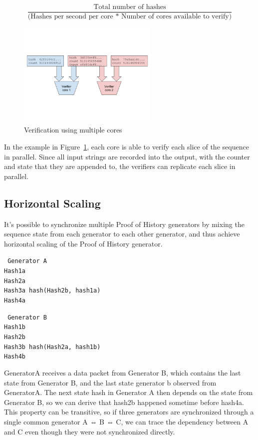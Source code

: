 \documentclass[12pt]{article}
\begin{document}
\[
\frac{\textrm{Total number of hashes}}{\textrm{(Hashes per second per core * Number of cores available to verify)}}
\]

\begin{figure}
  \begin{center}
    \centering
    \includegraphics[width=0.6\textwidth]{figures/fig_4.png}
    \caption[Figure 4]{Verification using multiple cores\label{fig:poh_verify}}
  \end{center}
  \end{figure}

In the example in Figure~\ref{fig:poh_verify}, each core is able to verify each slice of the sequence in parallel. Since all input strings are recorded into the output, with the counter and state that they are appended to, the verifiers can replicate each slice in parallel.

\subsection{Horizontal Scaling}
It’s possible to synchronize multiple Proof of History generators by mixing the sequence state from each generator to each other generator, and thus achieve horizontal scaling of the Proof of History generator.

\texttt{
Generator A\\
Hash1a\\
Hash2a\\
Hash3a hash(Hash2b, hash1a)\\
Hash4a\\
}

\texttt{
Generator B\\
Hash1b\\
Hash2b\\
Hash3b hash(Hash2a, hash1b)\\
Hash4b\\
}

GeneratorA receives a data packet from Generator B, which contains the last state from Generator B, and the last state generator b observed from GeneratorA. The next state hash in Generator A then depends on the state from Generator B, so we can derive that hash2b happened sometime before hash4a. This property can be transitive, so if three generators are synchronized through a single common generator A ⇔ B ⇔ C, we can trace the dependency between A and C even though they were not synchronized directly.
\end{document}
